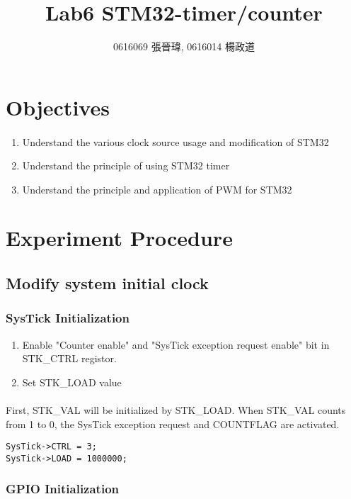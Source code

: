 \title{Lab6 STM32-timer/counter}
\author{0616069 張晉瑋, 0616014 楊政道}
\maketitle
\thispagestyle{fancy}
\section{Objectives}
\paragraph{}
\begin{enumerate}
    \item Understand the various clock source usage and modification of STM32
    \item Understand the principle of using STM32 timer
    \item Understand the principle and application of PWM for STM32
\end{enumerate}
\section{Experiment Procedure}
\subsection{Modify system initial clock}
\subsubsection{SysTick Initialization}
\begin{enumerate}
    \item Enable "Counter enable" and "SysTick exception request enable" bit in STK\_CTRL registor.
    \item Set STK\_LOAD value
\end{enumerate}
\paragraph{}
First, STK\_VAL will be initialized by STK\_LOAD. When STK\_VAL counts from 1 to 0, the SysTick exception request and COUNTFLAG are activated.
\begin{lstlisting}
SysTick->CTRL = 3;
SysTick->LOAD = 1000000;
\end{lstlisting}
\subsubsection{GPIO Initialization}
